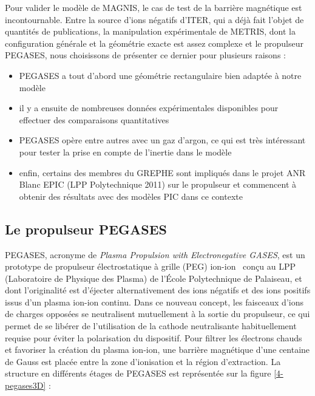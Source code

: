 \begin{refsection}
Pour valider le modèle de MAGNIS, le cas de test de la barrière magnétique est
incontournable. Entre la source d'ions négatifs d'ITER, qui a déjà fait l'objet
de quantités de publications, la manipulation expérimentale de METRIS, dont la
configuration générale et la géométrie exacte est assez complexe et le propulseur PEGASES,
nous choisissons de présenter ce dernier pour plusieurs raisons : 

\begin{itemize}
  \item PEGASES a tout d'abord une géométrie rectangulaire bien adaptée à notre
  modèle 
  \item il y a ensuite de nombreuses données expérimentales disponibles pour
  effectuer des comparaisons quantitatives
  \item PEGASES opère entre autres avec un gaz d'argon, ce
  qui est très intéressant pour tester la prise en compte de l'inertie dans le
  modèle
  \item enfin, certains des membres du GREPHE sont impliqués dans le projet ANR
  Blanc EPIC (LPP Polytechnique 2011) sur le propulseur et commencent à obtenir
  des résultats avec des modèles PIC dans ce contexte
\end{itemize}


\subsection{Le propulseur PEGASES}
PEGASES, acronyme de \emph{Plasma Propulsion with Electronegative GASES}, est
un prototype de propulseur électrostatique à grille (PEG)
ion-ion~\parencite{Chabert} conçu au LPP (Laboratoire de Physique des
Plasma) de l'École Polytechnique de Palaiseau, et dont l'originalité est
d'éjecter alternativement des ions négatifs et des ions positifs issus d'un plasma ion-ion continu.
Dans ce nouveau concept, les faisceaux d'ions de charges opposées se
neutralisent mutuellement à la sortie du propulseur, ce qui permet de se
libérer de l'utilisation de la cathode neutralisante habituellement requise
pour éviter la polarisation du dispositif.
Pour filtrer les électrons chauds et favoriser la création du plasma ion-ion, une
barrière magnétique d'une centaine de Gauss est placée entre la zone
d'ionisation et la région d'extraction. La structure en différents étages de PEGASES est représentée sur la
figure \ref{4-pegases3D} :


\end{refsection}
